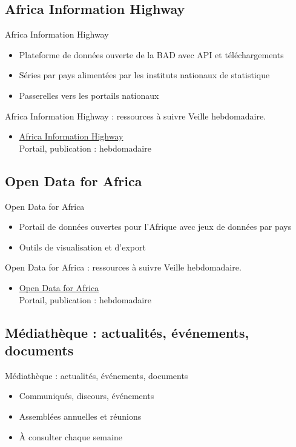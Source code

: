 \documentclass[aspectratio=169,11pt]{beamer}
\begin{document}
\subsection{Africa Information Highway}
\begin{frame}{Africa Information Highway}
\begin{itemize}
\item Plateforme de données ouverte de la BAD avec API et téléchargements
\item Séries par pays alimentées par les instituts nationaux de statistique
\item Passerelles vers les portails nationaux
\end{itemize}
\end{frame}

\begin{frame}{Africa Information Highway : ressources à suivre}
\small
Veille hebdomadaire.
\begin{itemize}
\item \href{https://africaninfohighway.afdb.org}{Africa Information Highway}\\{\footnotesize Portail, publication : hebdomadaire}
\end{itemize}
\end{frame}

\subsection{Open Data for Africa}
\begin{frame}{Open Data for Africa}
\begin{itemize}
\item Portail de données ouvertes pour l'Afrique avec jeux de données par pays
\item Outils de visualisation et d'export
\end{itemize}
\end{frame}

\begin{frame}{Open Data for Africa : ressources à suivre}
\small
Veille hebdomadaire.
\begin{itemize}
\item \href{https://dataportal.opendataforafrica.org}{Open Data for Africa}\\{\footnotesize Portail, publication : hebdomadaire}
\end{itemize}
\end{frame}

\subsection{Médiathèque : actualités, événements, documents}
\begin{frame}{Médiathèque : actualités, événements, documents}
\begin{itemize}
\item Communiqués, discours, événements
\item Assemblées annuelles et réunions
\item À consulter chaque semaine
\end{itemize}
\end{frame}
\end{document}
